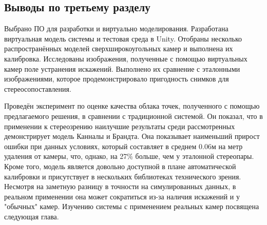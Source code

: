 \subsection{Выводы по третьему разделу}

Выбрано ПО для разработки и виртуально моделирования. Разработана виртуальная модель системы и тестовая среда в Unity. 
Отобраны несколько распространённых моделей сверхширокоугольных камер и выполнена их калибровка.
Исследованы изображения, полученные с помощью виртуальных камер поле устранения искажений. Выполнено их сравнение 
с эталонными изображениями,  которое продемонстрировало пригодность снимков для стереосопоставления.

Проведён эксперимент
по оценке качества облака точек, полученного с помощью предлагаемого решения, в сравнении с традиционной системой. 
Он показал, что в применении к стереозрению наилучшие результаты среди рассмотренных демонстрирует модель Канналы и Брандта. 
Она показывает наименьший прирост ошибки при данных условиях, который составляет в среднем 0.06м на метр удаления от камеры, 
что, однако, на 27\% больше, чем у эталонной стереопары. Кроме того, модель является довольно доступной в плане автоматической 
калибровки и присутствует в нескольких библиотеках технического зрения. Несмотря на заметную разницу в точности на симулированных 
данных, в реальном применении она может сократиться из-за наличия искажений и у "обычных" камер. Изучению системы 
 с применением реальных камер посвящена следующая глава. 
